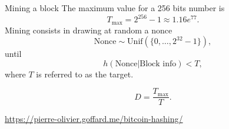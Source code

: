 \documentclass{beamer}
\begin{document}
\begin{frame}{Mining a block}
The maximum value for a 256 bits number is
$$
T_\text{max} = 2^{256}-1 \approx 1.16e^{77}.
$$
Mining consists in drawing at random a nonce 
$$
\text{Nonce} \sim \text{Unif}(\{0,\ldots, 2^{32}-1\}),
$$
until 
$$
h(\text{Nonce}|\text{Block info})<T,
$$
where $T$ is referred to as the target.
\begin{tcolorbox}[enhanced,drop shadow, title=Difficulty of the cryptopuzzle]
$$
D = \frac{T_{\max}}{T}.
$$
\end{tcolorbox}
\url{https://pierre-olivier.goffard.me/bitcoin-hashing/}
\end{frame}
\end{document}
